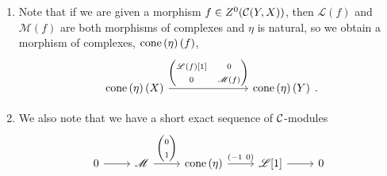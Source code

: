 \documentclass[dissertation.tex]{subfiles}
\begin{document}
\begin{rmk}
  \begin{enumerate}
  \item
    Note that if we are given a morphism $f \in Z^0(\mathcal{C}(Y,X))$, then $\mathscr{L}(f)$ and $\mathscr{M}(f)$ are both morphisms of complexes and $\eta$ is natural, so we obtain a morphism of complexes, $\operatorname{cone}\left(\eta\right)(f)$,
    $$\begin{tikzcd}[ampersand replacement=\&]
      \cone{\eta}(X) \arrow{rrr}{\left(\begin{matrix}\mathscr{L}(f)[1] & 0\\0 & \mathscr{M}(f)\end{matrix}\right)} \&\&\& \cone{\eta}(Y)
    \end{tikzcd}.$$
  \item
    We also note that we have a short exact sequence of $\mathcal{C}$-modules
    $$\begin{tikzcd}
      0 \arrow{r} & \mathscr{M} \arrow{r}{\left(\begin{matrix}0\\1\end{matrix}\right)} & \cone{\eta} \arrow{r}{\left(-1\ 0\right)} & \mathscr{L}[1] \arrow{r} & 0
    \end{tikzcd}$$
  \end{enumerate}
\end{rmk}
\end{document}

